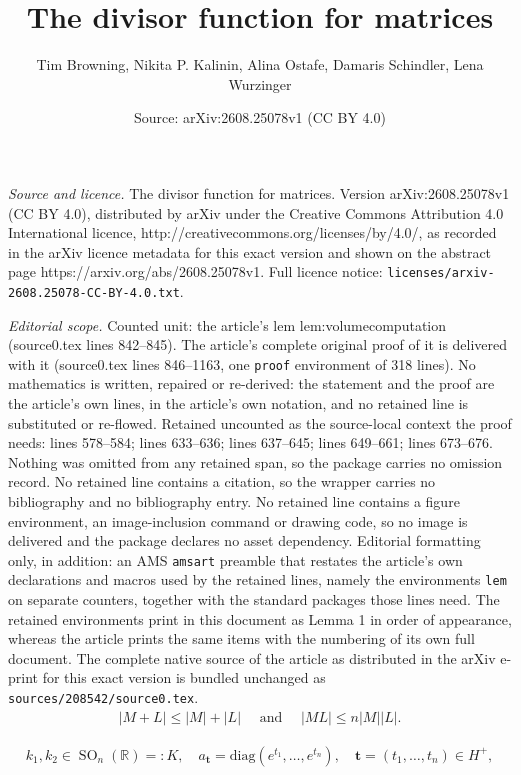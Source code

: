 \documentclass[10pt,a4paper]{amsart}
\title{The divisor function for matrices}
\author{Tim Browning, Nikita P. Kalinin, Alina Ostafe, Damaris Schindler, Lena Wurzinger}
\date{Source: arXiv:2608.25078v1 (CC BY 4.0)}
\def \R {{\mathbb R}}
\newcommand{\SO}{\operatorname{SO}}
\begin{document}
\maketitle

\noindent\emph{Source and licence.} The divisor function for matrices. Version arXiv:2608.25078v1 (CC BY 4.0), distributed by arXiv under the Creative Commons Attribution 4.0 International licence, http://creativecommons.org/licenses/by/4.0/, as recorded in the arXiv licence metadata for this exact version and shown on the abstract page https://arxiv.org/abs/2608.25078v1. Full licence notice: \texttt{licenses/arxiv-2608.25078-CC-BY-4.0.txt}.\par\smallskip

\noindent\textit{Editorial scope.} Counted unit: the article's lem lem:volumecomputation (source0.tex lines 842--845). The article's complete original proof of it is delivered with it (source0.tex lines 846--1163, one \texttt{proof} environment of 318 lines). No mathematics is written, repaired or re-derived: the statement and the proof are the article's own lines, in the article's own notation, and no retained line is substituted or re-flowed.  Retained uncounted as the source-local context the proof needs: lines 578--584; lines 633--636; lines 637--645; lines 649--661; lines 673--676.  Nothing was omitted from any retained span, so the package carries no omission record.  No retained line contains a citation, so the wrapper carries no bibliography and no bibliography entry.  No retained line contains a figure environment, an image-inclusion command or drawing code, so no image is delivered and the package declares no asset dependency.  Editorial formatting only, in addition: an AMS \texttt{amsart} preamble that restates the article's own declarations and macros used by the retained lines, namely the environments \texttt{lem} on separate counters, together with the standard packages those lines need.  The retained environments print in this document as Lemma 1 in order of appearance, whereas the article prints the same items with the numbering of its own full document.  The complete native source of the article as distributed in the arXiv e-print for this exact version is bundled unchanged as \texttt{sources/208542/source0.tex}.
\begin{align}\label{eq:basic_infty_norm_inequ}
    | M + L | \le  | M| +
    | L| \quad
    \text{ and } \quad
    | M  L| \le  n| M | 
    | L|.
\end{align}

    \begin{align}
    \label{eq:cartan_decomp}
         k_1, k_2 \in \SO_n(\R) =:K, \quad a_{\mathbf{t}} = \mathrm{diag}(e^{t_1}, \ldots, e^{t_n}), \quad \mathbf{t} = (t_1,\ldots, t_n) \in H^{+}, 
    \end{align}
\end{document}
